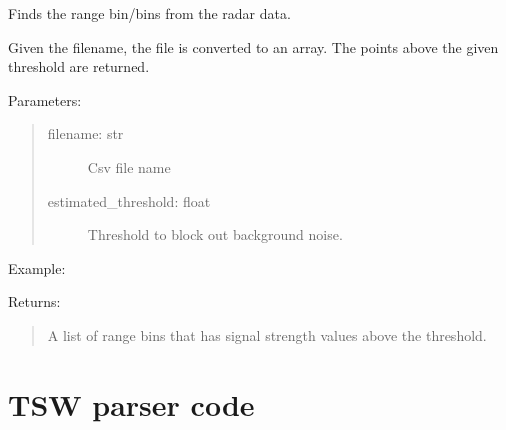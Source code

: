 \documentclass[letterpaper,10pt,english]{sphinxmanual}
\begin{document}
\begin{fulllineitems}
\label{\detokenize{X4 radar:X4_threshold.range_finder}}
Finds the range bin/bins from the radar data.

Given the filename, the file is converted to an array. The points above the given threshold are returned.

Parameters:
\begin{quote}
\begin{description}
\item[{filename: str}] \leavevmode
Csv file name

\item[{estimated\_threshold: float}] \leavevmode
Threshold to block out background noise.

\end{description}
\end{quote}

Example:

\begin{sphinxVerbatim}[commandchars=\\\{\}]
\PYG{p}{[}\PYG{p}{]}
\end{sphinxVerbatim}

Returns:
\begin{quote}

A list of range bins that has signal strength values above the threshold.
\end{quote}

\end{fulllineitems}



\section{TSW parser code}
\label{\detokenize{TSW radar:module-TSW_IWR}}\label{\detokenize{TSW radar:tsw-parser-code}}\label{\detokenize{TSW radar::doc}}
\end{document}
